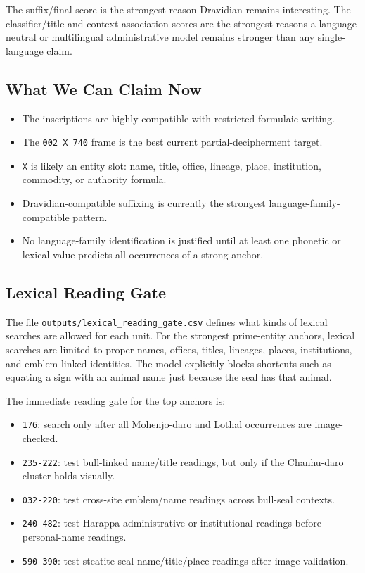 The suffix/final score is the strongest reason Dravidian remains interesting. The classifier/title and context-association scores are the strongest reasons a language-neutral or multilingual administrative model remains stronger than any single-language claim.

\subsection{What We Can Claim Now}

\begin{itemize}
  \item The inscriptions are highly compatible with restricted formulaic writing.
  \item The \texttt{002 X 740} frame is the best current partial-decipherment target.
  \item \texttt{X} is likely an entity slot: name, title, office, lineage, place, institution, commodity, or authority formula.
  \item Dravidian-compatible suffixing is currently the strongest language-family-compatible pattern.
  \item No language-family identification is justified until at least one phonetic or lexical value predicts all occurrences of a strong anchor.
\end{itemize}

\subsection{Lexical Reading Gate}

The file \texttt{outputs/lexical\_reading\_gate.csv} defines what kinds of lexical searches are allowed for each unit. For the strongest prime-entity anchors, lexical searches are limited to proper names, offices, titles, lineages, places, institutions, and emblem-linked identities. The model explicitly blocks shortcuts such as equating a sign with an animal name just because the seal has that animal.

The immediate reading gate for the top anchors is:

\begin{itemize}
  \item \texttt{176}: search only after all Mohenjo-daro and Lothal occurrences are image-checked.
  \item \texttt{235-222}: test bull-linked name/title readings, but only if the Chanhu-daro cluster holds visually.
  \item \texttt{032-220}: test cross-site emblem/name readings across bull-seal contexts.
  \item \texttt{240-482}: test Harappa administrative or institutional readings before personal-name readings.
  \item \texttt{590-390}: test steatite seal name/title/place readings after image validation.
\end{itemize}

